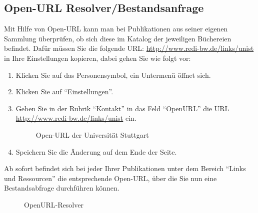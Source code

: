 \subsection{Open-URL Resolver/Bestandsanfrage}
Mit Hilfe von Open-URL kann man bei Publikationen aus seiner eigenen Sammlung überprüfen, ob sich diese im Katalog der jeweiligen Büchereien befindet. Dafür müssen Sie  die folgende URL:  
\url{http://www.redi-bw.de/links/unist} in Ihre Einstellungen kopieren, dabei gehen Sie wie folgt vor:
\begin{enumerate}
    \item Klicken Sie auf das Personensymbol, ein Untermenü öffnet sich.
    \item Klicken Sie auf \enquote{Einstellungen}.
    \item Geben Sie in der Rubrik \enquote{Kontakt} in das Feld \enquote{OpenURL} die URL \url{http://www.redi-bw.de/links/unist} ein. 
\begin{figure}[h!]
 \centering
 \caption{Open-URL der Universität Stuttgart}
 \label{figure031}
\end{figure}
    \item Speichern Sie die Änderung auf dem Ende der Seite.
\end{enumerate}
Ab sofort befindet sich bei jeder Ihrer Publikationen unter dem Bereich \enquote{Links und Ressourcen} die entsprechende Open-URL, über die Sie nun eine Bestandsabfrage durchführen können.
\begin{figure}[h!]
 \centering
 \caption{OpenURL-Resolver}
 \label{figure032}
\end{figure}
